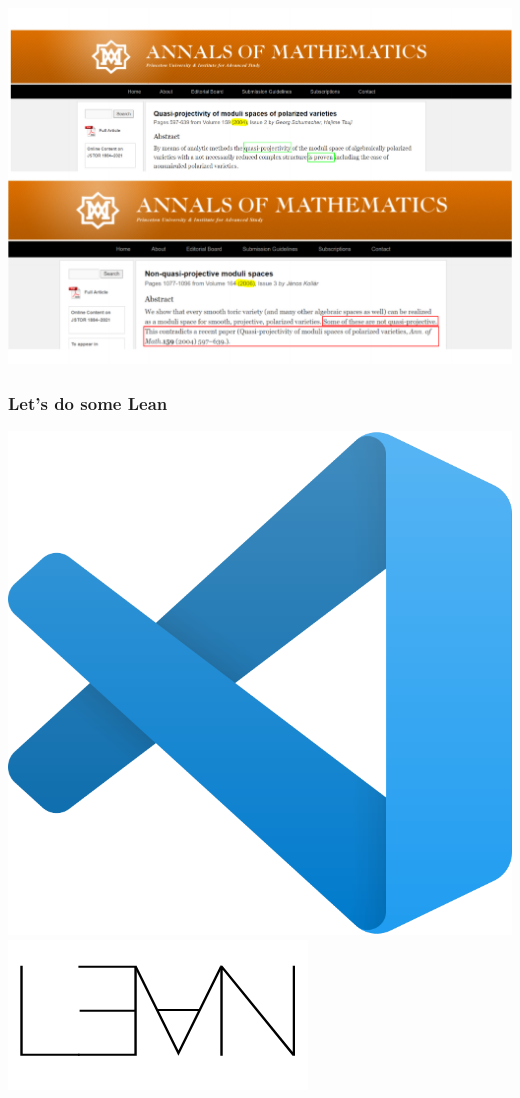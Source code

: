\documentclass[10pt]{beamer}
\begin{document}
\begin{frame}
\includegraphics[trim=1.3cm 0 0 1cm, scale = .4]{Annals_Flattened.pdf}
\end{frame}
\begin{frame}
\frametitle{Let's do some Lean}
\includegraphics[scale=.15]{vscode_logo.png}\hspace{1cm}\includegraphics[trim=0 -1.45cm 5cm 5cm, scale=.5]{lean_logo.png}
\end{frame}
\end{document}
